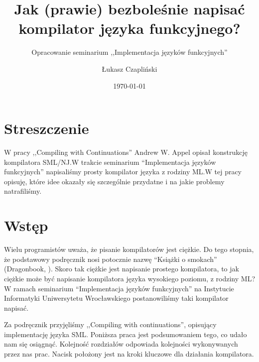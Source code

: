 \documentclass[11pt]{scrartcl}
\title{Jak (prawie) bezboleśnie napisać kompilator języka funkcyjnego?}
\subtitle{Opracowanie seminarium ,,Implementacja języków funkcyjnych''}
\author{Łukasz Czapliński}
\date{\today}
\begin{document}
\maketitle

\vfill
\section*{Streszczenie}
W pracy ,,Compiling with Continuations'' Andrew W. Appel opisał konstrukcję
kompilatora SML/NJ.\@ W trakcie seminarium “Implementacja języków funkcyjnych”
napisaliśmy prosty kompilator języka z rodziny ML.\@ W  tej pracy opisuję, które
idee okazały się szczególnie przydatne i na jakie problemy natrafiliśmy.

\vfill

\pagebreak


\section{Wstęp}
Wielu programistów uważa, że pisanie kompilatorów jest ciężkie. Do tego stopnia,
że podstawowy podręcznik nosi potocznie nazwę “Książki o smokach” (Dragonbook,
\cite{Dragonbook}).
Skoro tak ciężkie jest napisanie prostego kompilatora, to jak ciężkie może być
napisanie kompilatora języka wysokiego poziomu, z rodziny ML?\@ W ramach
seminarium “Implementacja języków funkcyjnych” na Instytucie Informatyki
Uniwersytetu Wrocławskiego postanowiliśmy taki kompilator napisać.

Za podręcznik przyjęliśmy ,,Compiling with continuations'', opisujący
implementację języka SML.
Poniższa praca jest podsumowaniem tego, co udało nam się osiągnąć.
Kolejność rozdziałów odpowiada kolejności wykonywanych przez nas prac.
Nacisk położony jest na kroki kluczowe dla działania kompilatora.
\end{document}
